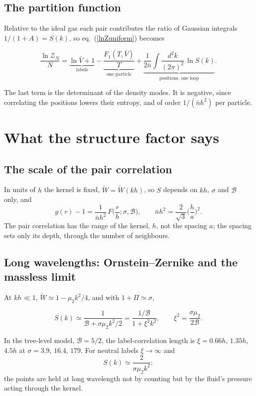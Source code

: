\documentclass[11pt,aps,preprint,nofootinbib,superscriptaddress,tightenlines]{revtex4-2}
\newcommand{\klab}{\mathcal B}
\def\st{\begin{equation}}
\def\stp{\end{equation}}
\def\Eq#1{eq.~(\ref{#1})}
\begin{document}
\subsection{The partition function}
\label{sec:posloop}

Relative to the ideal gas each pair contributes the ratio of Gaussian integrals $1/(1+A)=S(k)$, so \Eq{lnZuniform} becomes
\begin{keyeq}
\st
\frac{\ln\mathcal Z_N}N=\underbrace{\ln\bar V+1}_{\text{labels}}-\underbrace{\frac{F_1(T,\bar V)}T}_{\text{one particle}}
+\underbrace{\frac1{2\bar n}\int\frac{d^2k}{(2\pi)^2}\,\ln S(k)}_{\text{positions, one loop}} .
\label{lnZN}
\stp
\end{keyeq}
The last term is the determinant of the density modes.  It is negative, since correlating the positions lowers their entropy, and of order $1/(\bar nh^2)$ per particle.

\section{What the structure factor says}
\label{sec:predict}

\subsection{The scale of the pair correlation}
\label{sec:scale}

In units of $h$ the kernel is fixed, $\widetilde W=\widetilde W(kh)$, so $S$ depends on $kh$, $\sigma$ and $\klab$ only, and
\st
g(r)-1=\frac1{\bar nh^2}\,F\Big(\frac rh;\sigma,\klab\Big),\qquad \bar nh^2=\frac2{\sqrt3}\Big(\frac ha\Big)^2 .
\stp
The pair correlation has the range of the kernel, $h$, not the spacing $a$; the spacing sets only its depth, through the number of neighbours.

\subsection{Long wavelengths: Ornstein--Zernike and the massless limit}
\label{sec:OZ}

At $kh\ll1$, $\widetilde W\simeq1-\mu_2k^2/4$, and with $1+\Pi\simeq\sigma$,
\begin{keyeq}
\st
S(k)\simeq\frac1{\klab+\sigma\mu_2k^2/2}=\frac{1/\klab}{1+\xi^2k^2},\qquad \xi^2=\frac{\sigma\mu_2}{2\klab} .
\label{OZ}
\stp
\end{keyeq}
In the tree-level model, $\klab=5/2$, the label-correlation length is $\xi=0.66h$, $1.35h$, $4.5h$ at $\sigma=3.9$, $16.4$, $179$.  For neutral labels $\xi\to\infty$ and
\st
S(k)\simeq\frac2{\sigma\mu_2k^2} :
\stp
the points are held at long wavelength not by counting but by the fluid's pressure acting through the kernel.
\end{document}
